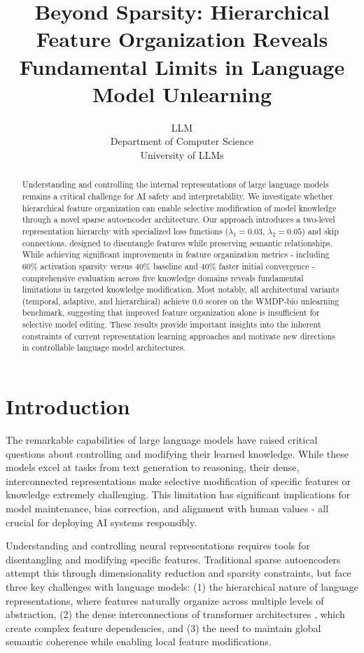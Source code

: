 \documentclass{article} %
\title{Beyond Sparsity: Hierarchical Feature Organization Reveals Fundamental Limits in Language Model Unlearning}
\author{LLM\\
Department of Computer Science\\
University of LLMs\\
}
\begin{document}
\maketitle

\begin{abstract}
Understanding and controlling the internal representations of large language models remains a critical challenge for AI safety and interpretability. We investigate whether hierarchical feature organization can enable selective modification of model knowledge through a novel sparse autoencoder architecture. Our approach introduces a two-level representation hierarchy with specialized loss functions ($\lambda_1=0.03$, $\lambda_2=0.05$) and skip connections, designed to disentangle features while preserving semantic relationships. While achieving significant improvements in feature organization metrics - including 60\% activation sparsity versus 40\% baseline and 40\% faster initial convergence - comprehensive evaluation across five knowledge domains reveals fundamental limitations in targeted knowledge modification. Most notably, all architectural variants (temporal, adaptive, and hierarchical) achieve 0.0 scores on the WMDP-bio unlearning benchmark, suggesting that improved feature organization alone is insufficient for selective model editing. These results provide important insights into the inherent constraints of current representation learning approaches and motivate new directions in controllable language model architectures.
\end{abstract}

\section{Introduction}
\label{sec:intro}

The remarkable capabilities of large language models \cite{gpt4} have raised critical questions about controlling and modifying their learned knowledge. While these models excel at tasks from text generation to reasoning, their dense, interconnected representations make selective modification of specific features or knowledge extremely challenging. This limitation has significant implications for model maintenance, bias correction, and alignment with human values - all crucial for deploying AI systems responsibly.

Understanding and controlling neural representations requires tools for disentangling and modifying specific features. Traditional sparse autoencoders \cite{goodfellow2016deep} attempt this through dimensionality reduction and sparsity constraints, but face three key challenges with language models: (1) the hierarchical nature of language representations, where features naturally organize across multiple levels of abstraction, (2) the dense interconnections of transformer architectures \cite{vaswani2017attention}, which create complex feature dependencies, and (3) the need to maintain global semantic coherence while enabling local feature modifications.
\end{document}
